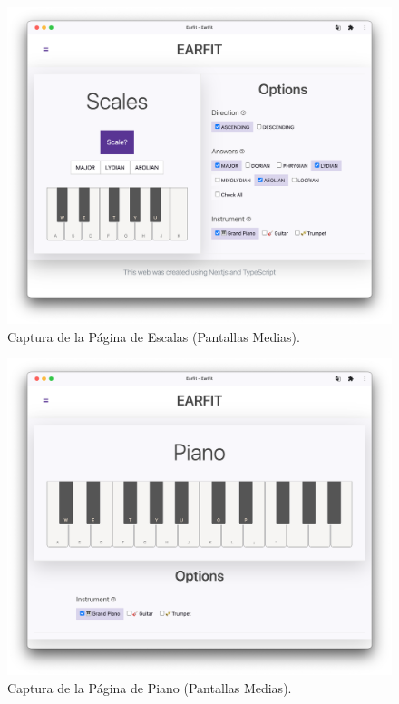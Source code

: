 \documentclass[12pt,twoside,titlepage]{report}
\begin{document}
\begin{figure}[H]
    \centering
    \includegraphics[scale=0.3]{Capturas Earfit/Tablet/Scales}
    \caption{Captura de la Página de Escalas (Pantallas Medias).}
    \label{fig:TabletScales}
\end{figure}

\begin{figure}[H]
    \centering
    \includegraphics[scale=0.3]{Capturas Earfit/Tablet/Piano}
    \caption{Captura de la Página de Piano (Pantallas Medias).}
    \label{fig:TabletPiano}
\end{figure}
\end{document}

